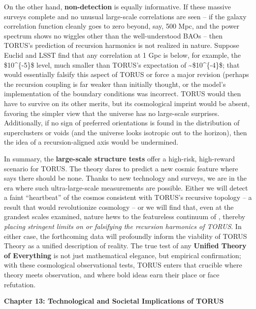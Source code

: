 \documentclass[]{article}
\begin{document}
On the other hand, \textbf{non-detection} is equally informative. If
these massive surveys complete and no unusual large-scale correlations
are seen -- if the galaxy correlation function cleanly goes to zero
beyond, say, 500 Mpc, and the power spectrum shows no wiggles other than
the well-understood BAOs -- then TORUS's prediction of recursion
harmonics is not realized in nature. Suppose Euclid and LSST find that
any correlation at 1 Gpc is below, for example, the \$10\^{}\{-5\}\$
level, much smaller than TORUS's expectation of
\textasciitilde{}\$10\^{}\{-4\}\$; that would essentially falsify this
aspect of TORUS or force a major revision (perhaps the recursion
coupling is far weaker than initially thought, or the model's
implementation of the boundary conditions was incorrect. TORUS would
then have to survive on its other merits, but its cosmological imprint
would be absent, favoring the simpler \LambdaCDM view that the universe has no
large-scale surprises. Additionally, if no sign of preferred
orientations is found in the distribution of superclusters or voids (and
the universe looks isotropic out to the horizon), then the idea of a
recursion-aligned axis would be undermined.

In summary, the \textbf{large-scale structure tests} offer a high-risk,
high-reward scenario for TORUS. The theory dares to predict a new cosmic
feature where \LambdaCDM says there should be none. Thanks to new technology
and surveys, we are in the era where such ultra-large-scale measurements
are possible. Either we will detect a faint ``heartbeat'' of the cosmos
consistent with TORUS's recursive topology -- a result that would
revolutionize cosmology -- or we will find that, even at the grandest
scales examined, nature hews to the featureless continuum of \LambdaCDM,
thereby \emph{placing stringent limits on or falsifying the recursion
harmonics of TORUS}. In either case, the forthcoming data will
profoundly inform the viability of TORUS Theory as a unified description
of reality. The true test of any \textbf{Unified Theory of Everything}
is not just mathematical elegance, but empirical confirmation; with
these cosmological observational tests, TORUS enters that crucible where
theory meets observation, and where bold ideas earn their place or face
refutation.

\textbf{Chapter 13: Technological and Societal Implications of TORUS}
\end{document}
